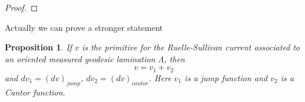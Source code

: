 \documentclass{ip-journal}
\newtheorem{proposition}[theorem]{Proposition}
\theoremstyle{definition}
\numberwithin{equation}{section}
\begin{document}
\begin{proof}
\end{proof}

Actually we can prove a stronger statement

\begin{proposition} If $v$ is the primitive for the Ruelle-Sullivan current associated to an oriented measured geodesic lamination $\Lambda$, then 
\[
v = v_1 + v_2
\]
 and $dv_1=(dv)_{jump}$, $dv_2=(dv)_{cantor}$. Here $v_1$ is a jump function and $v_2$ is a Cantor function.
\end{proposition}
\end{document}
